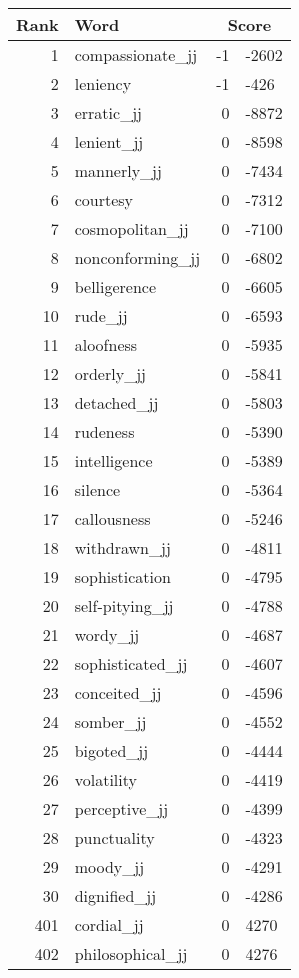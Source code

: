 \begin{longtable}[!htbp]{| rlr@{.}l |}
    \hline
    \textbf{Rank} & \textbf{Word} & \multicolumn{2}{c|}{\textbf{Score}} \\
    \hline
    \endhead
    1 & compassionate\_jj & -1 & -2602 \\
    2 & leniency & -1 & -426 \\
    3 & erratic\_jj & 0 & -8872 \\
    4 & lenient\_jj & 0 & -8598 \\
    5 & mannerly\_jj & 0 & -7434 \\
    6 & courtesy & 0 & -7312 \\
    7 & cosmopolitan\_jj & 0 & -7100 \\
    8 & nonconforming\_jj & 0 & -6802 \\
    9 & belligerence & 0 & -6605 \\
    10 & rude\_jj & 0 & -6593 \\
    11 & aloofness & 0 & -5935 \\
    12 & orderly\_jj & 0 & -5841 \\
    13 & detached\_jj & 0 & -5803 \\
    14 & rudeness & 0 & -5390 \\
    15 & intelligence & 0 & -5389 \\
    16 & silence & 0 & -5364 \\
    17 & callousness & 0 & -5246 \\
    18 & withdrawn\_jj & 0 & -4811 \\
    19 & sophistication & 0 & -4795 \\
    20 & self-pitying\_jj & 0 & -4788 \\
    21 & wordy\_jj & 0 & -4687 \\
    22 & sophisticated\_jj & 0 & -4607 \\
    23 & conceited\_jj & 0 & -4596 \\
    24 & somber\_jj & 0 & -4552 \\
    25 & bigoted\_jj & 0 & -4444 \\
    26 & volatility & 0 & -4419 \\
    27 & perceptive\_jj & 0 & -4399 \\
    28 & punctuality & 0 & -4323 \\
    29 & moody\_jj & 0 & -4291 \\
    30 & dignified\_jj & 0 & -4286 \\
    401 & cordial\_jj & 0 & 4270 \\
    402 & philosophical\_jj & 0 & 4276 \\

\end{longtable}
